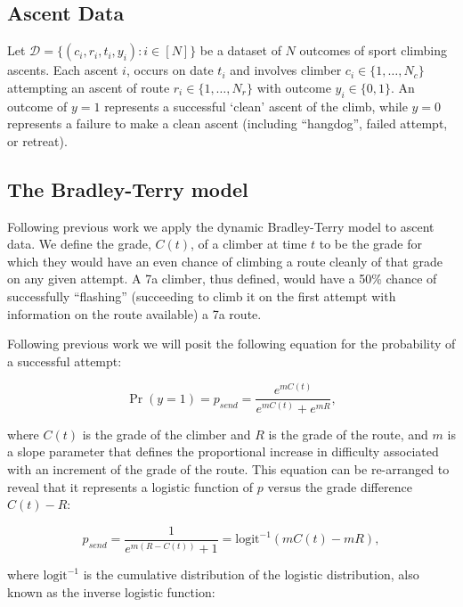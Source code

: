 \documentclass[12pt]{article}
\begin{document}
\subsection{Ascent Data}

Let $\mathcal{D} = \{(c_i, r_i, t_i, y_i) : i \in [N]\}$ be a dataset of $N$ outcomes of sport climbing ascents.  Each ascent $i$, occurs on date $t_i$ and involves climber $c_i \in \{1,\dots, N_c\}$ attempting an ascent of route $r_i \in \{1,\dots, N_r\}$ with outcome $y_i \in \{0,1\}$. An outcome of $y=1$ represents a successful `clean' ascent of the climb, while $y=0$ represents a failure to make a clean ascent (including ``\gls{hangdog}'', failed attempt, or retreat).

\subsection{The Bradley-Terry model}

Following previous work  \citep{scarff2020estimation} we apply the dynamic Bradley-Terry model \citep{zermelo1929berechnung,bradley1952rank} to ascent data. We define the grade, $C(t)$, of a climber at time $t$ to be the grade for which they would have an even chance of climbing a route cleanly of that grade on any given attempt. A 7a climber, thus defined, would have a 50\% chance of successfully ``flashing'' (succeeding to climb it on the first attempt with information on the route available) a 7a route.

Following previous work \citep{scarff2020estimation} we will posit the following equation for the probability of a successful attempt:

\begin{equation}
\Pr(y = 1) = p_{send} = \frac{e^{mC(t)}}{e^{mC(t)} + e^{mR}},
\end{equation}

where $C(t)$ is the grade of the climber and $R$ is the grade of the route, and $m$ is a slope parameter that defines the proportional increase in difficulty associated with an increment of the grade of the route. This equation can be re-arranged to reveal that it represents a logistic function of $p$ versus the grade difference $C(t)-R$:

\begin{equation}
p_{send} = \frac{1}{e^{m(R-C(t))} + 1} = \textrm{logit}^{-1}(mC(t)-mR),
\label{logisticp}
\end{equation}

where $\textrm{logit}^{-1}$ is the cumulative distribution of the logistic distribution, also known as the inverse logistic function:
\end{document}
